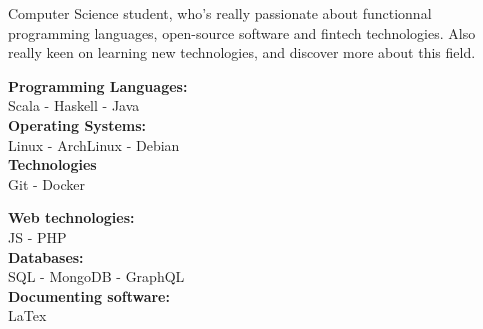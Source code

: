 \documentclass[10pt]{developercv} %
\begin{document}
\begin{minipage}[t]{0.4\textwidth} %
	
    \vspace{-\baselineskip} %
	
    {Computer Science student, who's really passionate about functionnal programming languages, 
    open-source software and fintech technologies.
    \newline Also really keen on learning new technologies, and discover more about this field. 
	}%
\end{minipage}
\hfill %
\begin{minipage}[t]{0.575\textwidth} %
   
	\vspace{-\baselineskip} %
	    \begin{minipage}[t]{0.475 \textwidth}
	 		\textbf{Programming Languages:}\\
	 		\vspace{0.3em}
    		{\hspace{2pt}Scala - Haskell - Java}\\
    		\textbf{Operating Systems:}\\
	 		\vspace{0.3em}
    		{\hspace{2pt}Linux - ArchLinux - Debian}\\
            \textbf{Technologies}\\
            \vspace{0.3em}
            {\hspace{2pt}Git - Docker}\\
	    \end{minipage}
        \hfill
	    \begin{minipage}[t]{0.5 \textwidth}
	 		\textbf{Web technologies:}\\
            \vspace{0.3em}
            {\hspace{2pt}JS - PHP}\\
	 		\textbf{Databases:}\\
            \vspace{0.3em}
            {\hspace{2pt}SQL - MongoDB - GraphQL}\\
       		\textbf{Documenting software:}\\
	 		\vspace{0.3em}
    		{\hspace{2pt} LaTex}\\
        \end{minipage}
\end{minipage}
\end{document}
